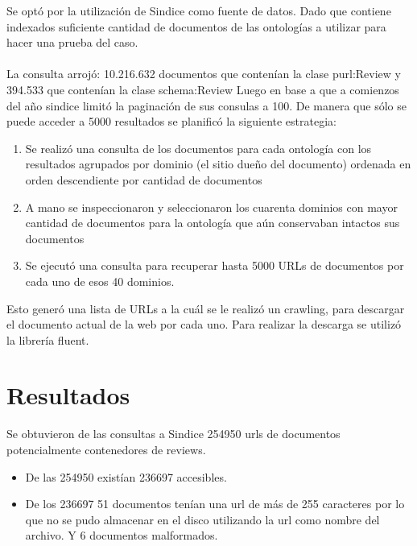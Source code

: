 Se optó por la utilización de Sindice como fuente de datos. Dado que contiene indexados suficiente cantidad de documentos de las 
ontologías a utilizar para hacer una prueba del caso.
\\\\
La consulta arrojó: 10.216.632 documentos que contenían la clase purl:Review y 394.533 que contenían la clase schema:Review
Luego en base a que a comienzos del año sindice limitó la paginación de sus consulas a 100. De manera que sólo se puede acceder a 5000 
resultados se planificó la siguiente estrategia:
\begin{enumerate}
 \item Se realizó una consulta de los documentos para cada ontología con los resultados agrupados por dominio (el sitio dueño del documento) ordenada en orden descendiente por cantidad de documentos 
 \item A mano se inspeccionaron y seleccionaron los cuarenta dominios con mayor cantidad de documentos para la ontología que aún conservaban intactos sus documentos
 \item Se ejecutó una consulta para recuperar hasta 5000 URLs de documentos por cada uno de esos 40 dominios.
\end{enumerate}

\noindent Esto generó una lista de URLs a la cuál se le realizó un crawling, para descargar el documento actual de la web por cada uno. Para realizar la descarga se utilizó la librería fluent.

\section{Resultados}
\label{section:recoleccion-resultados}

\noindent Se obtuvieron de las consultas a Sindice 254950 urls de documentos potencialmente contenedores de reviews.
\begin{itemize}
 \item De las 254950 existían 236697 accesibles.
 \item De los 236697 51 documentos tenían una url de más de 255 caracteres por lo que no se pudo almacenar en el disco utilizando la url como nombre del archivo. Y 6 documentos malformados.
\end{itemize}

